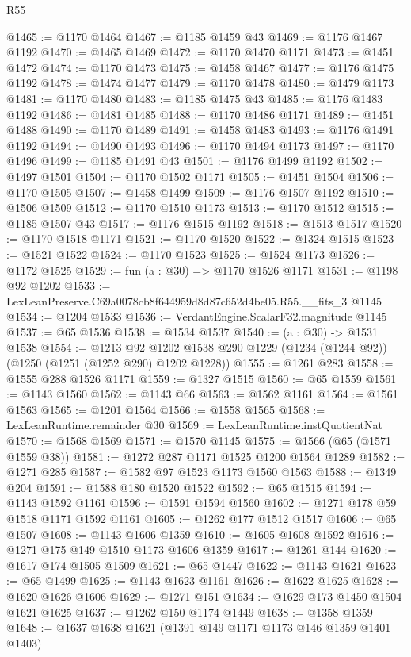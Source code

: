 \begin{lexlean}{R55}
\begin{coremodule}
@1465 := @1170 @1464
@1467 := @1185 @1459 @43
@1469 := @1176 @1467 @1192
@1470 := @1465 @1469
@1472 := @1170 @1470 @1171
@1473 := @1451 @1472
@1474 := @1170 @1473
@1475 := @1458 @1467
@1477 := @1176 @1475 @1192
@1478 := @1474 @1477
@1479 := @1170 @1478
@1480 := @1479 @1173
@1481 := @1170 @1480
@1483 := @1185 @1475 @43
@1485 := @1176 @1483 @1192
@1486 := @1481 @1485
@1488 := @1170 @1486 @1171
@1489 := @1451 @1488
@1490 := @1170 @1489
@1491 := @1458 @1483
@1493 := @1176 @1491 @1192
@1494 := @1490 @1493
@1496 := @1170 @1494 @1173
@1497 := @1170 @1496
@1499 := @1185 @1491 @43
@1501 := @1176 @1499 @1192
@1502 := @1497 @1501
@1504 := @1170 @1502 @1171
@1505 := @1451 @1504
@1506 := @1170 @1505
@1507 := @1458 @1499
@1509 := @1176 @1507 @1192
@1510 := @1506 @1509
@1512 := @1170 @1510 @1173
@1513 := @1170 @1512
@1515 := @1185 @1507 @43
@1517 := @1176 @1515 @1192
@1518 := @1513 @1517
@1520 := @1170 @1518 @1171
@1521 := @1170 @1520
@1522 := @1324 @1515
@1523 := @1521 @1522
@1524 := @1170 @1523
@1525 := @1524 @1173
@1526 := @1172 @1525
@1529 := fun (a : @30) => @1170 @1526 @1171
@1531 := @1198 @92 @1202
@1533 := LexLeanPreserve.C69a0078cb8f644959d8d87c652d4be05.R55.__fits_3 @1145
@1534 := @1204 @1533
@1536 := VerdantEngine.ScalarF32.magnitude @1145
@1537 := @65 @1536
@1538 := @1534 @1537
@1540 := (a : @30) -> @1531 @1538
@1554 := @1213
    @92
    @1202
    @1538
    @290
    @1229
    (@1234 (@1244 @92))
    (@1250 (@1251 (@1252 @290) @1202 @1228))
@1555 := @1261 @283
@1558 := @1555 @288 @1526 @1171
@1559 := @1327 @1515
@1560 := @65 @1559
@1561 := @1143 @1560
@1562 := @1143 @66
@1563 := @1562 @1161
@1564 := @1561 @1563
@1565 := @1201 @1564
@1566 := @1558 @1565
@1568 := LexLeanRuntime.remainder @30
@1569 := LexLeanRuntime.instQuotientNat
@1570 := @1568 @1569
@1571 := @1570 @1145
@1575 := @1566 (@65 (@1571 @1559 @38))
@1581 := @1272 @287 @1171 @1525 @1200 @1564 @1289
@1582 := @1271 @285
@1587 := @1582 @97 @1523 @1173 @1560 @1563
@1588 := @1349 @204
@1591 := @1588 @180 @1520 @1522
@1592 := @65 @1515
@1594 := @1143 @1592 @1161
@1596 := @1591 @1594 @1560
@1602 := @1271 @178 @59 @1518 @1171 @1592 @1161
@1605 := @1262 @177 @1512 @1517
@1606 := @65 @1507
@1608 := @1143 @1606 @1359
@1610 := @1605 @1608 @1592
@1616 := @1271 @175 @149 @1510 @1173 @1606 @1359
@1617 := @1261 @144
@1620 := @1617 @174 @1505 @1509
@1621 := @65 @1447
@1622 := @1143 @1621
@1623 := @65 @1499
@1625 := @1143 @1623 @1161
@1626 := @1622 @1625
@1628 := @1620 @1626 @1606
@1629 := @1271 @151
@1634 := @1629 @173 @1450 @1504 @1621 @1625
@1637 := @1262 @150 @1174 @1449
@1638 := @1358 @1359
@1648 := @1637 @1638 @1621 (@1391 @149 @1171 @1173 @146 @1359 @1401 @1403)

\end{coremodule}
\end{lexlean}
